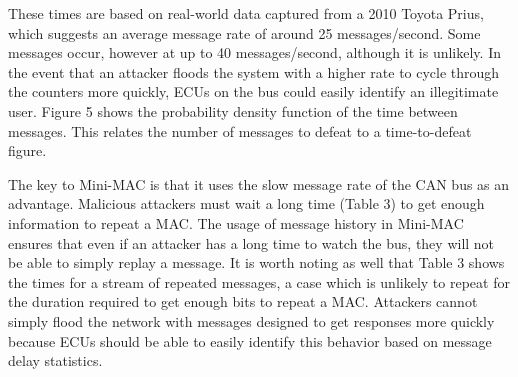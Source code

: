 These times are based on real-world data captured from a 2010 Toyota Prius, which suggests an average message rate of around 25 messages/second. Some messages occur, however at up to 40 messages/second, although it is unlikely. In the event that an attacker floods the system with a higher rate to cycle through the counters more quickly, ECUs on the bus could easily identify an illegitimate user. Figure 5 shows the probability density function of the time between messages. This relates the number of messages to defeat to a time-to-defeat figure.



The key to Mini-MAC is that it uses the slow message rate of the CAN bus as an advantage. Malicious attackers must wait a long time (Table 3) to get enough information to repeat a MAC. The usage of message history in Mini-MAC ensures that even if an attacker has a long time to watch the bus, they will not be able to simply replay a message. It is worth noting as well that Table 3 shows the times for a stream of repeated messages, a case which is unlikely to repeat for the duration required to get enough bits to repeat a MAC. Attackers cannot simply flood the network with messages designed to get responses more quickly because ECUs should be able to easily identify this behavior based on message delay statistics.


